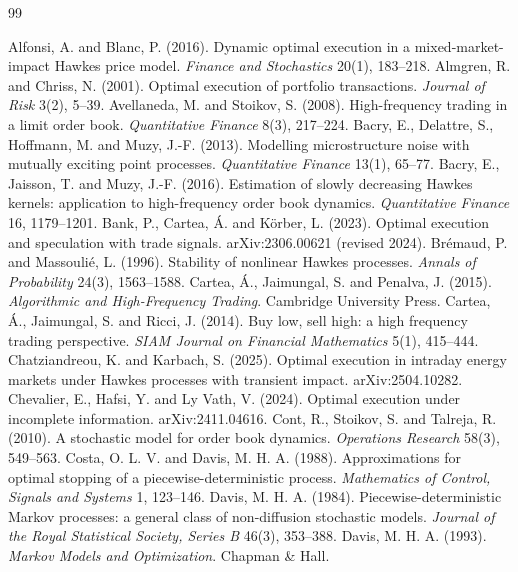 \documentclass[11pt]{article}
\theoremstyle{definition}
\theoremstyle{remark}
\begin{document}
\begin{thebibliography}{99}
\small

 Alfonsi, A. and Blanc, P. (2016). Dynamic optimal execution in a mixed-market-impact Hawkes price model. \emph{Finance and Stochastics} 20(1), 183--218.
 Almgren, R. and Chriss, N. (2001). Optimal execution of portfolio transactions. \emph{Journal of Risk} 3(2), 5--39.
 Avellaneda, M. and Stoikov, S. (2008). High-frequency trading in a limit order book. \emph{Quantitative Finance} 8(3), 217--224.
 Bacry, E., Delattre, S., Hoffmann, M. and Muzy, J.-F. (2013). Modelling microstructure noise with mutually exciting point processes. \emph{Quantitative Finance} 13(1), 65--77.
 Bacry, E., Jaisson, T. and Muzy, J.-F. (2016). Estimation of slowly decreasing Hawkes kernels: application to high-frequency order book dynamics. \emph{Quantitative Finance} 16, 1179--1201.
 Bank, P., Cartea, \'A. and K\"orber, L. (2023). Optimal execution and speculation with trade signals. arXiv:2306.00621 (revised 2024).
 Br\'emaud, P. and Massouli\'e, L. (1996). Stability of nonlinear Hawkes processes. \emph{Annals of Probability} 24(3), 1563--1588.
 Cartea, \'A., Jaimungal, S. and Penalva, J. (2015). \emph{Algorithmic and High-Frequency Trading}. Cambridge University Press.
 Cartea, \'A., Jaimungal, S. and Ricci, J. (2014). Buy low, sell high: a high frequency trading perspective. \emph{SIAM Journal on Financial Mathematics} 5(1), 415--444.
 Chatziandreou, K. and Karbach, S. (2025). Optimal execution in intraday energy markets under Hawkes processes with transient impact. arXiv:2504.10282.
 Chevalier, E., Hafsi, Y. and Ly Vath, V. (2024). Optimal execution under incomplete information. arXiv:2411.04616.
 Cont, R., Stoikov, S. and Talreja, R. (2010). A stochastic model for order book dynamics. \emph{Operations Research} 58(3), 549--563.
 Costa, O. L. V. and Davis, M. H. A. (1988). Approximations for optimal stopping of a piecewise-deterministic process. \emph{Mathematics of Control, Signals and Systems} 1, 123--146.
 Davis, M. H. A. (1984). Piecewise-deterministic Markov processes: a general class of non-diffusion stochastic models. \emph{Journal of the Royal Statistical Society, Series B} 46(3), 353--388.
 Davis, M. H. A. (1993). \emph{Markov Models and Optimization}. Chapman \& Hall.

\end{thebibliography}
\end{document}
